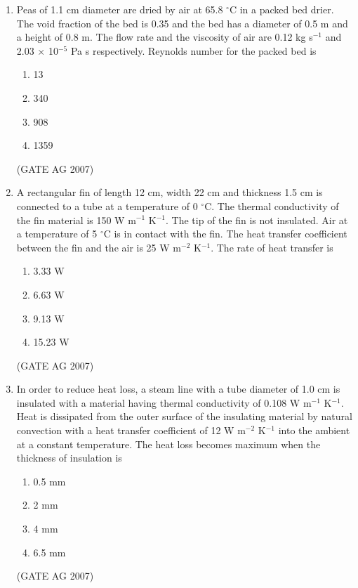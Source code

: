 \documentclass[journal,12pt,onecolumn]{IEEEtran}
\theoremstyle{remark}
\begin{document}
\begin{enumerate}[label=Q\arabic*:]
\item Peas of 1.1 cm diameter are dried by air at 65.8 $^{\circ}$C in a packed bed drier. The void fraction of the bed is 0.35 and the bed has a diameter of 0.5 m and a height of 0.8 m. The flow rate and the viscosity of air are 0.12 kg s$^{-1}$ and 2.03 $\times$ 10$^{-5}$ Pa s respectively. Reynolds number for the packed bed is
\begin{multicols}{4}
\begin{enumerate}
    \item 13
    \item 340
    \item 908
    \item 1359
\end{enumerate}
\end{multicols}
\hfill(GATE AG 2007)

\item A rectangular fin of length 12 cm, width 22 cm and thickness 1.5 cm is connected to a tube at a temperature of 0 $^{\circ}$C. The thermal conductivity of the fin material is 150 W m$^{-1}$ K$^{-1}$. The tip of the fin is not insulated. Air at a temperature of 5 $^{\circ}$C is in contact with the fin. The heat transfer coefficient between the fin and the air is 25 W m$^{-2}$ K$^{-1}$. The rate of heat transfer is
\begin{multicols}{4}
\begin{enumerate}
    \item 3.33 W
    \item 6.63 W
    \item 9.13 W
    \item 15.23 W
\end{enumerate}
\end{multicols}
\hfill(GATE AG 2007)

\item In order to reduce heat loss, a steam line with a tube diameter of 1.0 cm is insulated with a material having thermal conductivity of 0.108 W m$^{-1}$ K$^{-1}$. Heat is dissipated from the outer surface of the insulating material by natural convection with a heat transfer coefficient of 12 W m$^{-2}$ K$^{-1}$ into the ambient at a constant temperature. The heat loss becomes maximum when the thickness of insulation is
\begin{multicols}{4}
\begin{enumerate}
    \item 0.5 mm
    \item 2 mm
    \item 4 mm
    \item 6.5 mm
\end{enumerate}
\end{multicols}
\hfill(GATE AG 2007)


\end{enumerate}
\end{document}
